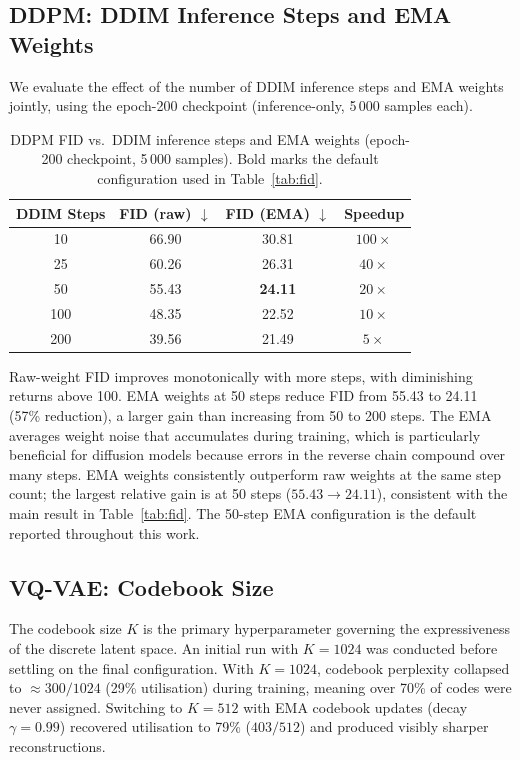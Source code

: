 \documentclass[12pt,a4paper]{article}
\begin{document}
\subsection{DDPM: DDIM Inference Steps and EMA Weights}

We evaluate the effect of the number of DDIM inference steps and EMA weights
jointly, using the epoch-200 checkpoint (inference-only, 5\,000 samples each).

\begin{table}[H]
  \centering
  \caption{DDPM FID vs.\ DDIM inference steps and EMA weights
           (epoch-200 checkpoint, 5\,000 samples).
           Bold marks the default configuration used in Table~\ref{tab:fid}.}
  \label{tab:ddpm_steps}
  \begin{tabular}{cccc}
    \toprule
    DDIM Steps & FID (raw) $\downarrow$ & FID (EMA) $\downarrow$ & Speedup \\
    \midrule
    10  & 66.90 & 30.81 & $100\times$ \\
    25  & 60.26 & 26.31 & $40\times$ \\
    50  & 55.43 & \textbf{24.11} & $20\times$ \\
    100  & 48.35 & 22.52 & $10\times$ \\
    200  & 39.56 & 21.49 & $5\times$ \\
    \bottomrule
  \end{tabular}
\end{table}

Raw-weight FID improves monotonically with more steps, with diminishing returns
above 100.  EMA weights at 50 steps reduce FID from 55.43 to 24.11 (57\% reduction), a larger gain than increasing from 50 to 200 steps.  The EMA averages
weight noise that accumulates during training, which is particularly beneficial for
diffusion models because errors in the reverse chain compound over many steps.
EMA weights consistently outperform raw weights at the same step count; the largest relative gain is at 50 steps ($55.43 \to 24.11$), consistent with the main result in Table~\ref{tab:fid}.
The 50-step EMA configuration is the default reported throughout this work.

\subsection{VQ-VAE: Codebook Size}
\label{sec:vqvae_ablation}

The codebook size $K$ is the primary hyperparameter governing the expressiveness
of the discrete latent space.  An initial run with $K=1024$ was conducted before
settling on the final configuration.  With $K=1024$, codebook perplexity
collapsed to $\approx 300/1024$ (29\% utilisation) during training, meaning
over 70\% of codes were never assigned.  Switching to $K=512$ with EMA codebook
updates (decay $\gamma=0.99$) recovered utilisation to 79\% ($403/512$) and
produced visibly sharper reconstructions.
\end{document}
